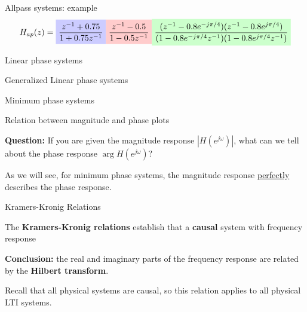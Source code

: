 \documentclass[10pt]{beamer}
\begin{document}
\begin{frame}{Allpass systems: example}
\begin{equation*}
H_{ap}(z) = \tikz[baseline]{\node[fill=blue!20,anchor=base] {$\displaystyle\frac{z^{-1}+ 0.75}{1 + 0.75z^{-1}}$};}\tikz[baseline]{\node[fill=red!20,anchor=base] {$\displaystyle\frac{z^{-1} - 0.5}{1 -0.5z^{-1}}$};}\tikz[baseline]{\node[fill=green!20,anchor=base] {$\displaystyle\frac{(z^{-1} - 0.8e^{-j\pi/4})(z^{-1} - 0.8e^{j\pi/4})}{(1 - 0.8e^{-j\pi/4}z^{-1})(1 - 0.8e^{j\pi/4}z^{-1})}$};}
\end{equation*}

\begin{center}
	\resizebox{0.6\linewidth}{!}{}
\end{center}

\end{frame}


\begin{frame}{Linear phase systems}

\end{frame}

\begin{frame}{Generalized Linear phase systems}

\end{frame}


\begin{frame}{Minimum phase systems}

\end{frame}

\begin{frame}{Relation between magnitude and phase plots}

\textbf{Question:} If you are given the magnitude response $|H(e^{j\omega})|$, what can we tell about the phase response $\arg H(e^{j\omega})$?

\pause

As we will see, for minimum phase systems, the magnitude response \underline{perfectly} describes the phase response.

\end{frame}

\begin{frame}{Kramers-Kronig Relations}

The \textbf{Kramers-Kronig relations} establish that a \textbf{causal} system with frequency response


\textbf{Conclusion:} the real and imaginary parts of the frequency response are related by the \textbf{Hilbert transform}.

Recall that all physical systems are causal, so this relation applies to all physical LTI systems.

\end{frame}
\end{document}
